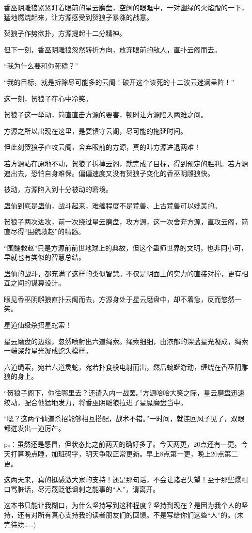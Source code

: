 \begin{this_body}
香巫阴雕狼紧紧盯着眼前的星云磨盘，空阔的眼眶中，一对幽绿的火焰蹭的一下，猛地燃烧起来，让方源感受到贺狼子暴涨的战意。

贺狼子作势欲扑，方源提起十二分精神。

但下一刻，香巫阴雕狼忽然转折方向，放弃眼前的敌人，直扑云阁而去。

“我为什么要和你死磕？”

“我的目标，就是拆除尽可能多的云阁！破开这个该死的十二波云迷澜蛊阵！”

这一刻，贺狼子在心中冷笑。

贺狼子这一举动，简直直击方源的要害，顿时让方源陷入两难之间。

方源之所以出现在这里，是要镇守云阁，尽可能的拖延时间。

但此刻贺狼子直攻云阁，舍弃眼前的方源，真的叫方源进退两难！

若方源站在原地不动，贺狼子拆掉云阁，就完成了目标，得到预定的胜利。若方源追出去，恐怕自身难保。偏偏速度又没有贺狼子变化的香巫阴雕狼快。

被动，方源陷入到十分被动的窘境。

蛊仙到底是蛊仙，战斗起来，难缠程度不是荒兽、上古荒兽可以媲美的。

贺狼子两次进攻，前一次绕过星云磨盘，攻方源，这一次舍弃方源，直攻云阁，简直尽得“围魏救赵”的精髓。

“围魏救赵”只是方源前前世地球上的典故，但这个蛊师世界的文明，也非同小可，早就也有类似的智慧总结。

蛊仙的战斗，都充满了这样的类似智慧。不仅是明面上的实力的直接对撞，更有相互之间的谋算设计。

眼见香巫阴雕狼直扑云阁而去，方源身处于星云磨盘中，却不着急，反而悠然一笑。

星道仙级杀招星蛇索！

星云磨盘的边缘，忽然喷射出六道绳索。绳索细细，由浓郁的深蓝星光凝成，绳索一端深蓝星光凝成蛇头模样。

六道绳索，宛若六道灵蛇，宛若扑食般电射而出，然后蜿蜒游动，缠绕在香巫阴雕狼的身上。

“贺狼子阁下，你往哪里去？还请入内一战罢。”方源哈哈大笑之际，星云磨盘迅速绞动，配合他猛地发力，将香巫阴雕狼拉进了星魔磨盘当中。

“嗯？这两个仙道杀招能够相互搭配，战术不错。”一时间，就连回风子见了，双眼都迸发出一道厉芒。

ps：虽然还是感冒，但状态比之前两天的确好多了。今天两更，20点还有一更。今天打算晚点睡，加班码字，明天争取正常更新。早上8点第一更，晚上20点第二更。

这两天来，真的挺感激大家的支持！还是那句话，不会让诸君失望！至于那些爆粗口骂脏话，尽污蔑贬低讽刺之能事的“人”，请离开。

这本书只能让我糊口，为什么坚持写到这种程度？坚持到现在？是因为我个人的坚持，还有对所有真心支持我的读者朋友们的回馈。不是写给你们这些“人”的。(未完待续……)

\end{this_body}

